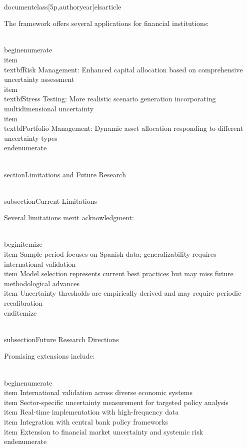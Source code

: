\\documentclass[5p,authoryear]{elsarticle}
\begin{document}
The framework offers several applications for financial institutions:

\\begin{enumerate}
    \\item \\textbf{Risk Management:} Enhanced capital allocation based on comprehensive uncertainty assessment
    \\item \\textbf{Stress Testing:} More realistic scenario generation incorporating multidimensional uncertainty
    \\item \\textbf{Portfolio Management:} Dynamic asset allocation responding to different uncertainty types
\\end{enumerate}

\\section{Limitations and Future Research}

\\subsection{Current Limitations}

Several limitations merit acknowledgment:

\\begin{itemize}
    \\item Sample period focuses on Spanish data; generalizability requires international validation
    \\item Model selection represents current best practices but may miss future methodological advances
    \\item Uncertainty thresholds are empirically derived and may require periodic recalibration
\\end{itemize}

\\subsection{Future Research Directions}

Promising extensions include:

\\begin{enumerate}
    \\item International validation across diverse economic systems
    \\item Sector-specific uncertainty measurement for targeted policy analysis
    \\item Real-time implementation with high-frequency data
    \\item Integration with central bank policy frameworks
    \\item Extension to financial market uncertainty and systemic risk
\\end{enumerate}
\end{document}
